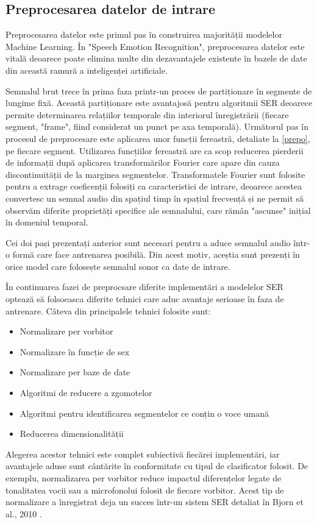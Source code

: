 \documentclass[a4paper,12pt]{book}
\begin{document}
					\subsection{Preprocesarea datelor de intrare}
						Preprocesarea datelor este primul pas în construirea majorității modelelor Machine Learning. În "Speech Emotion Recognition", preprocesarea datelor este vitală deoarece poate elimina multe din dezavantajele existente în bazele de date din această ramură a inteligenței artificiale.\par
						Semnalul brut trece în prima faza printr-un proces de partiționare în segmente de lungime fixă. Această partiționare este avantajosă pentru algoritmii SER deoarece permite determinarea relațiilor temporale din interiorul înregistrării (fiecare segment, "frame", fiind considerat un punct pe axa temporală). Următorul pas în procesul de preprocesare este aplicarea unor funcții fereastră, detaliate la \ref{prepo}, pe fiecare segment. Utilizarea funcțiilor fereastră are ca scop reducerea pierderii de informații după aplicarea transformărilor Fourier care apare din cauza discontinuității de la marginea segmentelor.
						Transformatele Fourier sunt folosite pentru a extrage coeficenții folosiți ca caracteristici de intrare, deoarece acestea convertesc un semnal audio din spațiul timp în spațiul frecvență și ne permit să observăm diferite proprietăți specifice ale semnalului, care rămân "ascunse" inițial în domeniul temporal. \par
						Cei doi pași prezentați anterior sunt necesari pentru a aduce semnalul audio într-o formă care face antrenarea posibilă. Din acest motiv, aceștia sunt prezenți în orice model care folosește semnalul sonor ca date de intrare. \par
						În continuarea fazei de preprocsare diferite implementări a modelelor SER optează să folsoeasca diferite tehnici care aduc avantaje serioase în faza de antrenare. Câteva din principalele tehnici folosite sunt:
						\begin{itemize}
							\setlength\itemsep{0pt}
							\setlength{\itemindent}{1.5cm}
							\item Normalizare per vorbitor
							\item Normalizare în funcție de sex
							\item Normalizare per baze de date
							\item Algoritmi de reducere a zgomotelor
							\item Algoritmi pentru identificarea segmentelor ce conțin o voce umană
							\item Reducerea dimensionalității
						\end{itemize}	
						Alegerea acestor tehnici este complet subiectivă fiecărei implementări, iar avantajele aduse sunt cântărite în conformitate cu tipul de clasificator folosit. De exemplu, normalizarea per vorbitor reduce impactul diferențelor legate de tonalitatea vocii sau a microfonolui folosit de fiecare vorbitor. Acest tip de normalizare a înregistrat deja un succes într-un sistem SER detaliat în Bjorn et al., 2010 \cite{spnorm}.
\end{document}
